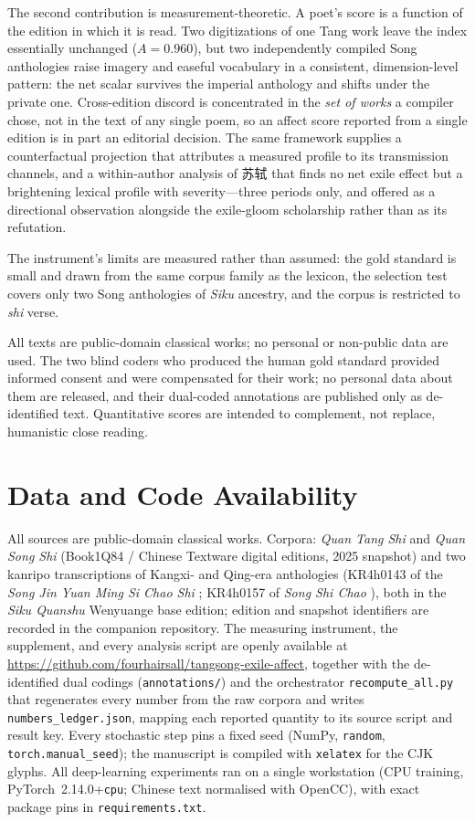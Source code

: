 \documentclass[10pt]{article}
\begin{document}
The second contribution is measurement-theoretic. A poet's score is a function of
the edition in which it is read. Two digitizations of one Tang work leave the index
essentially unchanged ($A{=}0.960$), but two independently compiled Song anthologies
raise imagery and easeful vocabulary in a consistent, dimension-level pattern: the
net scalar survives the imperial anthology and shifts under the private one.
Cross-edition discord is concentrated in the \emph{set of works} a compiler chose,
not in the text of any single poem, so an affect score reported from a single edition
is in part an editorial decision. The same framework supplies a counterfactual
projection that attributes a measured profile to its transmission channels, and a
within-author analysis of 苏轼 that finds no net exile effect but a brightening
lexical profile with severity---three periods only, and offered as a directional
observation alongside the exile-gloom scholarship rather than as its refutation.

The instrument's limits are measured rather than assumed: the gold standard is small
and drawn from the same corpus family as the lexicon, the selection test covers only
two Song anthologies of \emph{Siku} ancestry, and the corpus is restricted to
\emph{shi} verse.


All texts are public-domain classical works; no personal or non-public data are
used. The two blind coders who produced the human gold standard provided informed
consent and were compensated for their work; no personal data about them are
released, and their dual-coded annotations are published only as de-identified
text. Quantitative scores are intended to complement, not replace, humanistic close
reading.

\section*{Data and Code Availability}
\label{sec:repro}
All sources are public-domain classical works. Corpora: \emph{Quan Tang Shi} and
\emph{Quan Song Shi} (Book1Q84 / Chinese Textware digital editions, 2025 snapshot) and
two kanripo transcriptions of Kangxi- and Qing-era anthologies (KR4h0143 of the
\emph{Song Jin Yuan Ming Si Chao Shi} \citep{kangxi1709}; KR4h0157 of \emph{Song Shi
Chao} \citep{wu1671}), both in the \emph{Siku Quanshu} Wenyuange base edition; edition
and snapshot identifiers are recorded in the companion repository. The measuring
instrument, the supplement, and every analysis script are openly available at
\url{https://github.com/fourhairsall/tangsong-exile-affect}, together with the
de-identified dual codings (\texttt{annotations/}) and the orchestrator
\texttt{recompute\_all.py} that regenerates every number from the raw corpora and
writes \texttt{numbers\_ledger.json}, mapping each reported quantity to its source
script and result key. Every stochastic step pins a fixed seed (NumPy,
\texttt{random}, \texttt{torch.manual\_seed}); the manuscript is compiled with
\texttt{xelatex} for the CJK glyphs. All deep-learning experiments ran on a single
workstation (CPU training, PyTorch~2.14.0+\texttt{cpu}; Chinese text normalised with
OpenCC), with exact package pins in \texttt{requirements.txt}.
\end{document}
